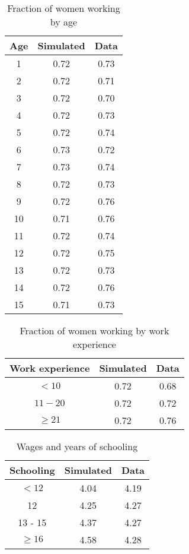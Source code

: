 \documentclass[11pt]{article}
\begin{document}
\begin{table}[H]
  \centering
  \caption{Fraction of women working by age}
    \begin{tabular}{|c|c|c|}
    \hline
    \textbf{Age} & \textbf{Simulated } & \textbf{Data} \\
    \hline
    1     & 0.72  & 0.73 \\
    2     & 0.72  & 0.71 \\
    3     & 0.72  & 0.70 \\
    4     & 0.72  & 0.73 \\
    5     & 0.72  & 0.74 \\
    6     & 0.73  & 0.72 \\
    7     & 0.73  & 0.74 \\
    8     & 0.72  & 0.73 \\
    9     & 0.72  & 0.76 \\
    10    & 0.71  & 0.76 \\
    11    & 0.72  & 0.74 \\
    12    & 0.72  & 0.75 \\
    13    & 0.72  & 0.73 \\
    14    & 0.72  & 0.76 \\
    15    & 0.71  & 0.73 \\
    \hline
    \end{tabular}%
  \label{tab:addlabel}%
\end{table}%


\begin{table}[H]
  \centering
  \caption{Fraction of women working by work experience}
    \begin{tabular}{|c|c|c|}
\hline
    \textbf{Work experience} & \textbf{Simulated} & \textbf{Data} \\
    \hline
    $<10$   & 0.72  & 0.68 \\
    $11-20$ & 0.72  & 0.72 \\
    $\geq 21$   & 0.72  & 0.76 \\
    \hline
    \end{tabular}%
  \label{tab:addlabel}%
\end{table}%



\begin{table}[H]
  \centering
  \caption{Wages and years of schooling}
    \begin{tabular}{|c|c|c|}
    \hline
    \textbf{Schooling} & \textbf{Simulated} & \textbf{Data} \\
    \hline
    $<12$   & 4.04  & 4.19 \\
    12    & 4.25  & 4.27 \\
    13 - 15 & 4.37  & 4.27 \\
    $\geq 16$   & 4.58  & 4.28 \\
    \hline
    \end{tabular}%
  \label{tab:addlabel}%
\end{table}%
\end{document}
